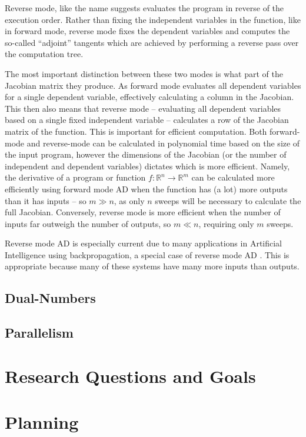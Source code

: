 \documentclass[a4paper]{article}
\begin{document}
            Reverse mode, like the name suggests evaluates the program in reverse of the execution order.
            Rather than fixing the independent variables in the function, like in forward mode, reverse mode fixes the dependent variables and computes the so-called ``adjoint'' tangents which are achieved by performing a reverse pass over the computation tree.

            The most important distinction between these two modes is what part of the Jacobian matrix they produce.
            As forward mode evaluates all dependent variables for a single dependent variable, effectively calculating a column in the Jacobian.
            This then also means that reverse mode -- evaluating all dependent variables based on a single fixed independent variable -- calculates a row of the Jacobian matrix of the function.
            This is important for efficient computation.
            Both forward-mode and reverse-mode can be calculated in polynomial time based on the size of the input program, however the dimensions of the Jacobian (or the number of independent and dependent variables) dictates which is more efficient.
            Namely, the derivative of a program or function $f:\mathbb{R}^n\to\mathbb{R}^m$ can be calculated more efficiently using forward mode AD when the function has (a lot) more outputs than it has inputs -- so $m\gg n$, as only $n$ sweeps will be necessary to calculate the full Jacobian.
            Conversely, reverse mode is more efficient when the number of inputs far outweigh the number of outputs, so $m\ll n$, requiring only $m$ sweeps.

            Reverse mode AD is especially current due to many applications in Artificial Intelligence using backpropagation, a special case of reverse mode AD \cite{baydin2018survey, wang2019demystifying}.
            This is appropriate because many of these systems have many more inputs than outputs.
            
        \subsection{Dual-Numbers}

        \subsection{Parallelism}


    \section{Research Questions and Goals} \label{sec:questions}

    \section{Planning} \label{sec:planning}

    \clearpage
    
    
\end{document}
